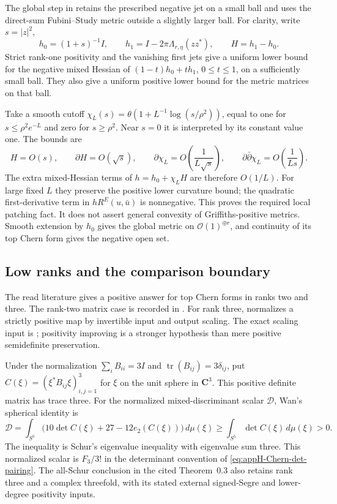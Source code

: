 The global step in \cite[Proposition~3.2; actual pp.~12--13]{Du26GriffithsTopChernV1}
retains the prescribed negative jet on a small ball and uses the
direct-sum Fubini--Study metric outside a slightly larger ball.
For clarity, write $s=|z|^2$,
\[
 h_0=(1+s)^{-1}I,\qquad
 h_1=I-2\pi\Lambda_{r,\eta}(zz^*),\qquad H=h_1-h_0.
\]
Strict rank-one positivity and the vanishing first jets give a
uniform lower bound for the negative mixed Hessian of
$(1-t)h_0+th_1$, $0\leq t\leq1$, on a sufficiently small ball.
They also give a uniform positive lower bound for the metric
matrices on that ball.

Take a smooth cutoff
$\chi_L(s)=\theta(1+L^{-1}\log(s/\rho^2))$, equal to one for
$s\leq\rho^2e^{-L}$ and zero for $s\geq\rho^2$. Near $s=0$
it is interpreted by its constant value one. The bounds are
\[
 H=O(s),\qquad \partial H=O(\sqrt s),\qquad
 \partial\chi_L=O\!\left(\frac1{L\sqrt s}\right),\qquad
 \partial\bar\partial\chi_L=O\!\left(\frac1{Ls}\right).
\]
The extra mixed-Hessian terms of $h=h_0+\chi_LH$ are therefore
$O(1/L)$. For large fixed $L$ they preserve the positive lower
curvature bound; the quadratic first-derivative term in
$hR^E(u,\bar u)$ is nonnegative. This proves the required local
patching fact. It does not assert general convexity of
Griffiths-positive metrics. Smooth extension by $h_0$ gives the
global metric on $\mathcal O(1)^{\oplus r}$, and continuity of its
top Chern form gives the negative open set.

\subsection{Low ranks and the comparison boundary}
\label{sec:appH-Chern-low-ranks}

The read literature gives a positive answer for top Chern forms
in ranks two and three. The rank-two matrix case is recorded in
\cite[Proposition~1.4(c)]{Finski22CharacteristicPublished}.
For rank three,
\cite[Theorems~0.3 and~2.11]{Wan26ThirdChernV2}
normalizes a strictly positive map by invertible input and output
scaling. The exact scaling input is
\cite[Theorem~1.2]{Idel16MatrixScalingV1}; positivity improving is
a stronger hypothesis than mere positive semidefinite preservation.

Under the normalization
$\sum_iB_{ii}=3I$ and $\operatorname{tr}(B_{ij})=3\delta_{ij}$,
put $C(\xi)=(\xi^*B_{ij}\xi)_{i,j=1}^3$ for $\xi$ on the unit
sphere in $\mathbf C^3$. This positive definite matrix has trace
three. For the normalized mixed-discriminant scalar $\mathcal D$,
Wan's spherical identity is
\begin{equation*}
 \mathcal D=\int_{S^5}
   \bigl(10\det C(\xi)+27-12e_2(C(\xi))\bigr)\,d\mu(\xi)
       \geq\int_{S^5}\det C(\xi)\,d\mu(\xi)>0 .
 \tag{H.33}\label{eq:appH-Chern-rank-three}
\end{equation*}
The inequality is Schur's eigenvalue inequality with eigenvalue
sum three. This normalized scalar is $F_3/3!$ in the determinant
convention of \eqref{eq:appH-Chern-det-pairing}.
The all-Schur conclusion in the cited Theorem~0.3 also retains
rank three and a complex threefold, with its stated external
signed-Segre and lower-degree positivity inputs.

